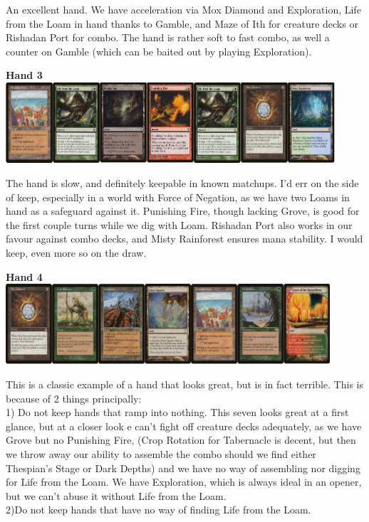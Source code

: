 \documentclass{report}
\begin{document}
An excellent hand. We have acceleration via Mox Diamond and Exploration, Life from the Loam in hand thanks to Gamble, and Maze of Ith for creature decks or Rishadan Port for combo. The hand is rather soft to fast combo, as well a counter on Gamble (which can be baited out by playing Exploration).\\
\begin{center}
\textbf{Hand 3\\}
\includegraphics [width =\textwidth, height = 3cm] {rghand3}
\end{center}
The hand is slow, and definitely keepable in known matchups. I'd err on the side of keep, especially in a world with Force of Negation, as we have two Loams in hand as a safeguard against it. Punishing Fire, though lacking Grove, is good for the first couple turns while we dig with Loam. Rishadan Port also works in our favour against combo decks, and Misty Rainforest ensures mana stability. I would keep, even more so on the draw.
\newpage
\begin{center}
\textbf{Hand 4\\}
\includegraphics [width =\textwidth, height = 3cm] {rghand4}
\end{center}
This is a classic example of a hand that looks great, but is in fact terrible. This is because of 2 things principally:
\\1) Do not keep hands that ramp into nothing. This seven looks great at a first glance, but at a closer look e can't fight off creature decks adequately, as we have Grove but no Punishing Fire, (Crop Rotation for Tabernacle is decent, but then we throw away our ability to assemble the combo should we find either Thespian's Stage or Dark Depths) and we have no way of assembling nor digging for Life from the Loam. We have Exploration, which is always ideal in an opener, but we can't abuse it without Life from the Loam.
\\2)Do not keep hands that have no way of finding Life from the Loam. 
\end{document}
